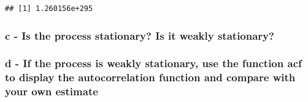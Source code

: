 \documentclass[]{article}
\newenvironment{Shaded}{\begin{snugshade}}{\end{snugshade}}
\newcommand{\ControlFlowTok}[1]{\textcolor[rgb]{0.13,0.29,0.53}{\textbf{#1}}}
\newcommand{\DecValTok}[1]{\textcolor[rgb]{0.00,0.00,0.81}{#1}}
\newcommand{\KeywordTok}[1]{\textcolor[rgb]{0.13,0.29,0.53}{\textbf{#1}}}
\newcommand{\NormalTok}[1]{#1}
\newcommand{\OperatorTok}[1]{\textcolor[rgb]{0.81,0.36,0.00}{\textbf{#1}}}
\newcommand{\StringTok}[1]{\textcolor[rgb]{0.31,0.60,0.02}{#1}}
\begin{document}
\begin{Shaded}
\end{Shaded}

\begin{verbatim}
## [1] 1.260156e+295
\end{verbatim}

\hypertarget{c---is-the-process-stationary-is-it-weakly-stationary}{%
\subsubsection{c - Is the process stationary? Is it weakly
stationary?}\label{c---is-the-process-stationary-is-it-weakly-stationary}}

\hypertarget{d---if-the-process-is-weakly-stationary-use-the-function-acf-to-display-the-autocorrelation-function-and-compare-with-your-own-estimate}{%
\subsubsection{d - If the process is weakly stationary, use the function
acf to display the autocorrelation function and compare with your own
estimate}\label{d---if-the-process-is-weakly-stationary-use-the-function-acf-to-display-the-autocorrelation-function-and-compare-with-your-own-estimate}}
\end{document}
